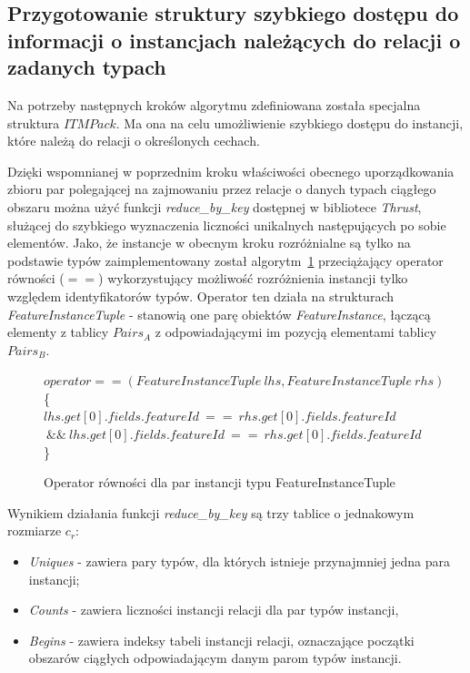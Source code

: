 \documentclass[12pt]{article}
\begin{document}
\subsection{Przygotowanie struktury szybkiego dostępu do informacji o instancjach należących do relacji o zadanych typach}

Na potrzeby następnych kroków algorytmu zdefiniowana została specjalna struktura $ ITMPack $. Ma ona na celu umożliwienie szybkiego dostępu do instancji, które należą do relacji o określonych cechach. 

Dzięki wspomnianej w poprzednim kroku właściwości obecnego uporządkowania zbioru par polegającej na zajmowaniu przez relacje o danych typach ciągłego obszaru można użyć funkcji \textit{reduce\_by\_key} dostępnej w bibliotece \textit{Thrust}, służącej do szybkiego wyznaczenia liczności unikalnych następujących po sobie elementów. Jako, że instancje w obecnym kroku rozróżnialne są tylko na podstawie typów zaimplementowany został algorytm~\ref{alg:FeatureInstanceTuple-operator} przeciążający operator równości ($ == $) wykorzystujący możliwość rozróżnienia instancji tylko względem identyfikatorów typów. Operator ten działa na strukturach \textit{FeatureInstanceTuple} - stanowią one parę obiektów \textit{FeatureInstance}, łączącą elementy z tablicy $ Pairs_{A} $ z odpowiadającymi im pozycją elementami tablicy $ Pairs_{B} $.

\begin{figure}[H]
\begin{algorithm}[H]
$operator==(FeatureInstanceTuple\ lhs,FeatureInstanceTuple\ rhs) $\\
\{\\
\Return $lhs.get[0].fields.featureId\ ==\ rhs.get[0].fields.featureId$\\
$\ \&\&\ lhs.get[0].fields.featureId\ ==\ rhs.get[0].fields.featureId$\\
\}
\caption{Operator równości dla par instancji typu FeatureInstanceTuple }
\label{alg:FeatureInstanceTuple-operator}
\end{algorithm}
\end{figure}

Wynikiem działania funkcji \textit{reduce\_by\_key} są trzy tablice o jednakowym rozmiarze $ c_{r} $:
\begin{itemize}
\item \textit{Uniques} - zawiera pary typów, dla których istnieje przynajmniej jedna para instancji;
\item \textit{Counts} - zawiera liczności instancji relacji dla par typów instancji,
\item \textit{Begins} - zawiera indeksy tabeli instancji relacji, oznaczające początki obszarów ciągłych odpowiadającym danym parom typów instancji.
\end{itemize}
\end{document}
